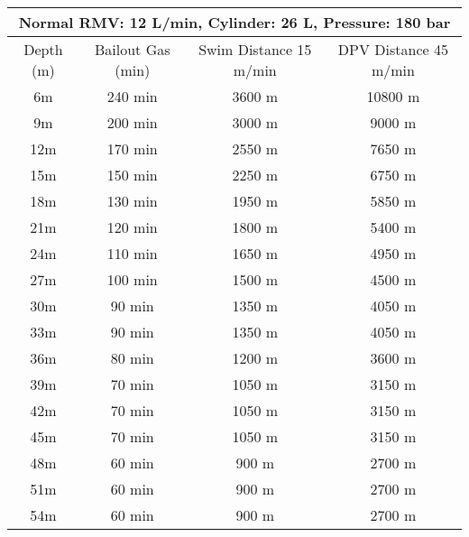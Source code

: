 \documentclass{article}
\begin{document}
\begin{tabular}{|c|c|c|c|}
\hline
\multicolumn{4}{|c|}{Normal RMV: 12 L/min, Cylinder: 26 L, Pressure: 180 bar} \\ 
\hline
Depth (m) & Bailout Gas (min) & Swim Distance 15 m/min & DPV Distance 45 m/min \\ 
\hline
6m & 240 min & 3600 m & 10800 m \\ 
\hline
9m & 200 min & 3000 m & 9000 m \\ 
\hline
12m & 170 min & 2550 m & 7650 m \\ 
\hline
15m & 150 min & 2250 m & 6750 m \\ 
\hline
18m & 130 min & 1950 m & 5850 m \\ 
\hline
21m & 120 min & 1800 m & 5400 m \\ 
\hline
24m & 110 min & 1650 m & 4950 m \\ 
\hline
27m & 100 min & 1500 m & 4500 m \\ 
\hline
30m & 90 min & 1350 m & 4050 m \\ 
\hline
33m & 90 min & 1350 m & 4050 m \\ 
\hline
36m & 80 min & 1200 m & 3600 m \\ 
\hline
39m & 70 min & 1050 m & 3150 m \\ 
\hline
42m & 70 min & 1050 m & 3150 m \\ 
\hline
45m & 70 min & 1050 m & 3150 m \\ 
\hline
48m & 60 min & 900 m & 2700 m \\ 
\hline
51m & 60 min & 900 m & 2700 m \\ 
\hline
54m & 60 min & 900 m & 2700 m \\ 
\hline
\end{tabular}
\vspace{12pt}
\end{document}
